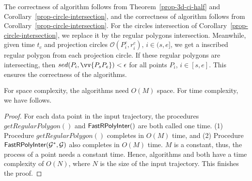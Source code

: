 The correctness of algorithm \cist follows from Theorem~\ref{prop-3d-ci-half} and Corollary~\ref{prop-circle-intersection}, and the correctness of algorithm \cista follows from Corollary~\ref{prop-circle-intersection}. For the circles intersection of Corollary~\ref{prop-circle-intersection}, we replace it by the regular polygons intersection.
Meanwhile, given time $t_c$ and projection circles $\mathcal{O}(P^c_i, r^c_i)$, $i \in (s, e]$, we get a inscribed regular polygon from each projection circle.
If these regular polygons are intersecting, then $sed(P_i, \vv{P_sP_e})<\epsilon$ for all points $P_i$, $i \in [s,e]$.
This ensures the correctness of the algorithms.

{For space complexity, the algorithms need $O(M)$ space.}
For time complexity, we have follows.


\begin{proof}
For each data point in the input trajectory, the procedures $getRegularPolygon()$ and ${\mathsf{FastRPolyInter}}()$ are both called one time.
(1) Procedure $getRegularPolygon()$ completes in $O(M)$ time, and
(2) Procedure ${\mathsf{FastRPolyInter}}(\mathcal{G}^*, \mathcal{G})$ also completes in $O(M)$ time.
$M$ is a constant, thus, the process of a point needs a constant time.
Hence, algorithms \cist and \cista both have a time complexity of $O(N)$, where $N$ is the size of the input trajectory.
This finishes the proof.
\end{proof}




